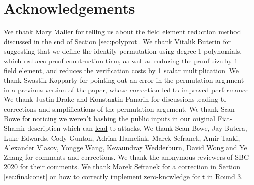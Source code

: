 \documentclass[11pt]{article} %
\newcommand{\chalpoint}{\ensuremath{\mathfrak{z}}\xspace}
\newcommand{\sigpolyevala}{\ensuremath{\mathsf{\bar{s}_{\sigma1}}}\xspace}
\newcommand{\sigpolyevalb}{\ensuremath{\mathsf{\bar{s}_{\sigma2}}}\xspace}
\newcommand{\sigcomma}{\ensuremath{[s_{\mathsf{\sigma1}}]_1}\xspace}
\newcommand{\sigcommb}{\ensuremath{[s_{\mathsf{\sigma2}}]_1}\xspace}
\begin{document}



 \section*{Acknowledgements} We thank Mary Maller for telling us about the field element reduction method discussed in the end of Section \ref{sec:polyprot}. We thank Vitalik Buterin for suggesting that we define the identity permutation using degree-1 polynomials, which reduces proof construction time, as well as reducing the proof size by 1 field element, and reduces the verification costs by 1 scalar multiplication. We thank Swastik Kopparty for pointing out an error in the permutation argument in a previous version of the paper, whose correction led to improved performance. We thank Justin Drake and Konstantin Panarin for discussions leading to corrections and simplifications of the permutation argument. We thank Sean Bowe for noticing we weren't hashing the public inputs in our original Fiat-Shamir description which can \href{https://blog.trailofbits.com/2022/04/18/the-frozen-heart-vulnerability-in-plonk/}{lead} to attacks. We thank Sean Bowe, Jay Butera, Luke Edwards, Cody Gunton, Adrian Hamelink, Marek Sefranek, Amir Taaki, Alexander Vlasov, Yongge Wang, Kevaundray Wedderburn, David Wong and Ye Zhang for comments and corrections. We thank the anonymous reviewers of SBC 2020 for their comments. We thank Marek Sefranek for a correction in Section \ref{sec:finalconst} on how to correctly implement zero-knowledge for $\mathsf{t}$ in Round 3. 

    
\end{document}
